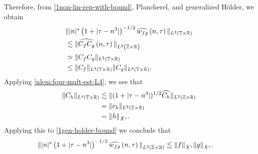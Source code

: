 %
%
%
Therefore, from \eqref{1non-lin-rep-with-bound}, Plancherel, and generalized 
H\"{o}lder, we obtain
%
%
\begin{equation}
	\label{1gen-holder-bound}
	\begin{split}
		& \| |n|^s \left( 1 + | \tau - n^3 | \right )^{-1/2}  \widehat{w_{fg}}\left( 
		n, \tau \right) \|_{L^2(\mathbb{T} \times \mathbb{R})}
		\\
		& \lesssim \|\widehat{C_f C_g }\left( n, \tau \right) 
		\|_{L^2\left( \dot{\mathbb{Z}} \times \mathbb{R} \right)}
		\\
		& \simeq \|C_f C_g \|_{L^2\left( \mathbb{T} \times \mathbb{R} \right)}
		\\
		& \le \|C_f \|_{L^4(\mathbb{T} \times \mathbb{R})} \|C_g \|_{L^4(\mathbb{T} \times \mathbb{R})}.
	\end{split}
\end{equation}
%
Applying \cref{nlem:four-mult-est-L4}, we see that
%
%
\begin{equation}
	\label{1four-mult-conseq}
	\begin{split}
		\|C_h\|_{L^4(\mathbb{T} \times \mathbb{R})} 
		& \lesssim \|(1 + | \tau - n^3 |)^{1/2} \widehat{C_h}
		\|_{L^2(\mathbb{Z} \times \mathbb{R})}
		\\
		& = \|c_{h} \|_{L^2(\mathbb{Z} \times \mathbb{R})} 
		\\
		& = \|h \|_{\dot{X}^s}. 
	\end{split}
\end{equation}
%
%
Applying this to \eqref{1gen-holder-bound} we
conclude that
\begin{equation*}
	\begin{split}
		\| |n|^s \left( 1 + | \tau - n^3 | \right ) ^{-1/2} \widehat{w_{fg}}\left( 
		n, \tau \right) \|_{L^2(\dot{\mathbb{Z}} \times \mathbb{R})}
		& \lesssim \|f\|_{\dot{X}^s} \|g\|_{\dot{X}^s}.
	\end{split}
\end{equation*}
%
%
%
